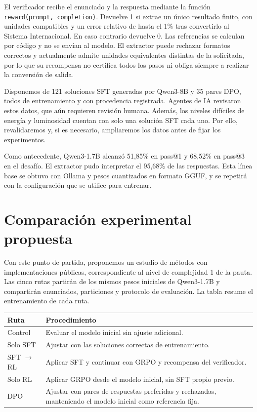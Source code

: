 El verificador recibe el enunciado y la respuesta mediante la función
\texttt{reward(prompt, completion)}. Devuelve 1 si extrae un único resultado
finito, con unidades compatibles y un error relativo de hasta el 1\% tras
convertirlo al Sistema Internacional. En caso contrario devuelve 0. Las referencias
se calculan por código y no se envían al modelo. El extractor puede rechazar
formatos correctos y actualmente admite unidades equivalentes distintas de la
solicitada, por lo que su recompensa no certifica todos los pasos ni obliga
siempre a realizar la conversión de salida.

Disponemos de 121 soluciones SFT generadas por Qwen3-8B y 35 pares DPO,
todos de entrenamiento y con procedencia registrada. Agentes de IA revisaron
estos datos, que aún requieren revisión humana. Además, los niveles difíciles
de energía y luminosidad cuentan con solo una solución SFT cada uno. Por ello,
revalidaremos y, si es necesario, ampliaremos los datos antes de fijar los experimentos.

Como antecedente, Qwen3-1.7B alcanzó 51,85\% en pass@1 y 68,52\% en pass@3
en el desafío. El extractor pudo interpretar el 95,68\% de las respuestas.
Esta línea base se obtuvo con Ollama y pesos cuantizados en formato GGUF,
y se repetirá con la configuración que se utilice para entrenar.

\section{Comparación experimental propuesta}
Con este punto de partida, proponemos un estudio de métodos con implementaciones
públicas, correspondiente al nivel de complejidad 1 de la pauta. Las cinco rutas
partirán de los mismos pesos iniciales de Qwen3-1.7B y compartirán enunciados,
particiones y protocolo de evaluación. La tabla resume el entrenamiento de cada ruta.

\begin{center}
\begin{tabular}{lp{.68\linewidth}}
\toprule
Ruta & Procedimiento \\
\midrule
Control & Evaluar el modelo inicial sin ajuste adicional. \\
Solo SFT & Ajustar con las soluciones correctas de entrenamiento. \\
SFT $\rightarrow$ RL & Aplicar SFT y continuar con GRPO y recompensa del verificador. \\
Solo RL & Aplicar GRPO desde el modelo inicial, sin SFT propio previo. \\
DPO & Ajustar con pares de respuestas preferidas y rechazadas, manteniendo el modelo inicial como referencia fija. \\
\bottomrule
\end{tabular}
\end{center}

